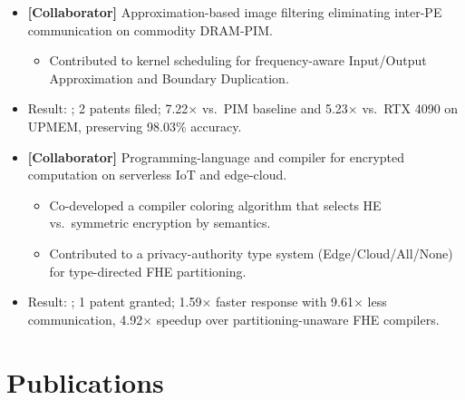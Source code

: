 \documentclass{cv}
\begin{document}
 
\begin{itemize}
  \item \textbf{[Collaborator]} Approximation-based image filtering eliminating inter-PE communication on commodity DRAM-PIM.
  \begin{itemize}
    \item Contributed to kernel scheduling for frequency-aware Input/Output Approximation and Boundary Duplication.
  \end{itemize}
  \item Result: ; 2 patents filed; 7.22$\times$ vs.\ PIM baseline and 5.23$\times$ vs.\ RTX 4090 on UPMEM, preserving 98.03\% accuracy.
\end{itemize}

\vspace{0.4em}

 
\begin{itemize}
  \item \textbf{[Collaborator]} Programming-language and compiler for encrypted computation on serverless IoT and edge-cloud.
  \begin{itemize}
    \item Co-developed a compiler coloring algorithm that selects HE vs.\ symmetric encryption by semantics.
    \item Contributed to a privacy-authority type system (Edge/Cloud/All/None) for type-directed FHE partitioning.
  \end{itemize}
  \item Result: ; 1 patent granted; 1.59$\times$ faster response with 9.61$\times$ less communication, 4.92$\times$ speedup over partitioning-unaware FHE compilers.
\end{itemize}



\section{Publications}

\printbibliography[check=isconf, heading=none]

\vspace{0.4em}
\printbibliography[check=isjour, heading=none]
\end{document}
